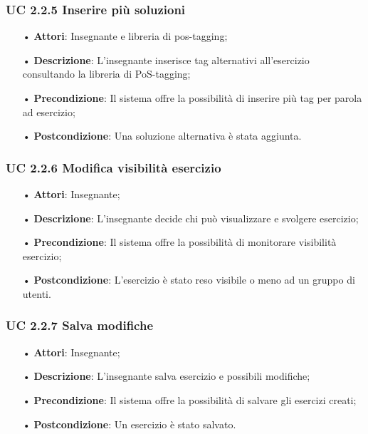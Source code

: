 \subsubsection{UC 2.2.5	Inserire più soluzioni}
\begin{itemize}
	\item[•] \textbf{Attori}: Insegnante e libreria di pos-tagging;
	\item[•] \textbf{Descrizione}: L'insegnante inserisce tag alternativi all’esercizio consultando la libreria di PoS-tagging;
	\item[•] \textbf{Precondizione}: Il sistema offre la possibilità di inserire più tag per parola ad esercizio;
	\item[•] \textbf{Postcondizione}: Una soluzione alternativa è stata aggiunta.
\end{itemize}
\subsubsection{UC 2.2.6	Modifica visibilità esercizio}
\begin{itemize}
	\item[•] \textbf{Attori}: Insegnante;
	\item[•] \textbf{Descrizione}: L'insegnante decide chi può visualizzare e svolgere esercizio;
	\item[•] \textbf{Precondizione}: Il sistema offre la possibilità di monitorare visibilità esercizio;
	\item[•] \textbf{Postcondizione}: L’esercizio è stato reso visibile o meno ad un gruppo di utenti.
\end{itemize}
\subsubsection{UC 2.2.7	Salva modifiche}
\begin{itemize}
	\item[•] \textbf{Attori}: Insegnante;
	\item[•] \textbf{Descrizione}: L'insegnante salva esercizio e possibili modifiche;
	\item[•] \textbf{Precondizione}: Il sistema offre la possibilità di salvare gli esercizi creati;
	\item[•] \textbf{Postcondizione}: Un esercizio è stato salvato.
\end{itemize}
